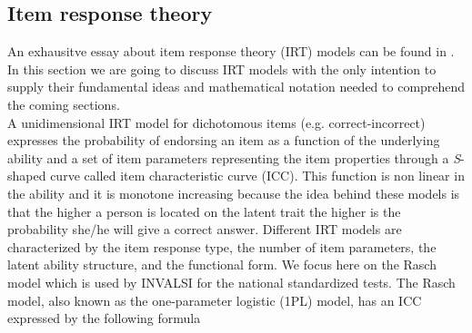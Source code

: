 \subsection{Item response theory}
\par{An exhausitve essay about item response theory (IRT) models can be found in \cite{HumbSwa85}. In this section we are going to discuss IRT models with the only intention to supply their fundamental ideas and mathematical notation needed to comprehend the coming sections. \\
A unidimensional IRT model for dichotomous items (e.g. correct-incorrect) expresses the probability of endorsing an item as a function of the underlying ability and a set of item parameters representing the item properties through a \textit{S}-shaped curve called item characteristic curve (ICC). This function is non linear in the ability and it is monotone increasing because the idea behind these models is that the higher a person is located on the latent trait the higher is the probability she/he will give a correct answer. Different IRT models are characterized by the item response type, the number of item parameters, the latent ability structure, and the functional form.
We focus here on the Rasch model \cite{Rasch19601980} which is used by INVALSI for the national standardized tests. The Rasch model, also known as the one-parameter logistic (1PL) model, has an ICC expressed by the following formula

}
